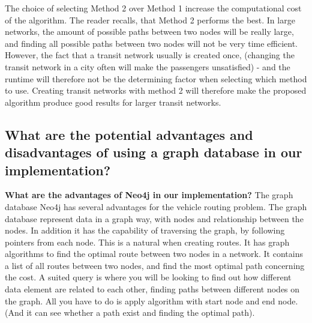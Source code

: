 The choice of selecting Method 2 over Method 1 increase the computational cost of the algorithm. The reader recalls, that Method 2 performs the best. In large networks, the amount of possible paths between two nodes will be really large, and finding all possible paths between two nodes will not be very time efficient. However, the fact that a transit network usually is created once, (changing the transit network in a city often will make the passengers unsatisfied) - and the runtime will therefore not be the determining factor when selecting which method to use. Creating transit networks with method 2 will therefore make the proposed algorithm produce good results for larger transit networks. 



\subsection{What are the potential advantages and disadvantages of using a graph database in our implementation?}

\textbf{What are the advantages of Neo4j in our implementation?}
The graph database Neo4j has several advantages for the vehicle routing problem. The graph database represent data in a graph way, with nodes and relationship between the nodes. In addition it has the capability of traversing the graph, by following pointers from each node. This is a natural when creating routes. It has graph algorithms to find the optimal route between two nodes in a network. It contains a list of all routes between two nodes, and find the most optimal path concerning the cost. A suited query is where you will be looking to find out how different data element are related to each other, finding paths between different nodes on the graph. All you have to do is apply algorithm with start node and end node. (And it can see whether a path exist and finding the optimal path). 

